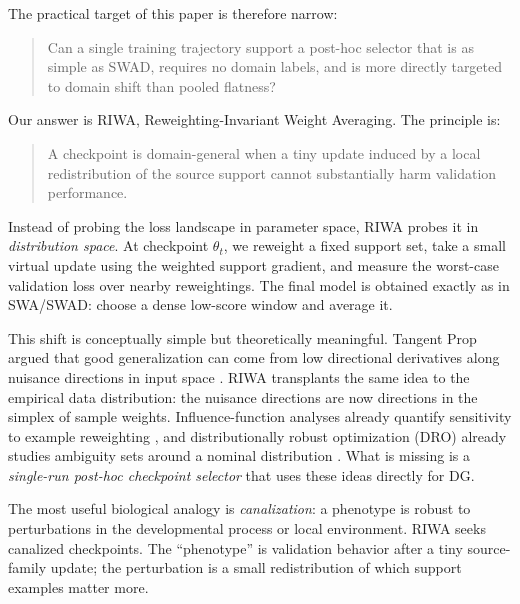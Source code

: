 \documentclass{article}
\newcommand{\riwa}{\textup{\textsc{RIWA}}}
\newcommand{\swad}{\textup{\textsc{SWAD}}}
\begin{document}
The practical target of this paper is therefore narrow:
\begin{quote}
Can a single training trajectory support a post-hoc selector that is as simple as \swad{}, requires no domain labels, and is more directly targeted to domain shift than pooled flatness?
\end{quote}

Our answer is \riwa{}, Reweighting-Invariant Weight Averaging. The principle is:
\begin{quote}
    A checkpoint is domain-general when a tiny update induced by a local redistribution of the source support cannot substantially harm validation performance.
\end{quote}
Instead of probing the loss landscape in parameter space, \riwa{} probes it in \emph{distribution space}. At checkpoint $\theta_t$, we reweight a fixed support set, take a small virtual update using the weighted support gradient, and measure the worst-case validation loss over nearby reweightings. The final model is obtained exactly as in SWA/\swad{}: choose a dense low-score window and average it.

This shift is conceptually simple but theoretically meaningful. Tangent Prop argued that good generalization can come from low directional derivatives along nuisance directions in input space \citep{simard1991tangent}. \riwa{} transplants the same idea to the empirical data distribution: the nuisance directions are now directions in the simplex of sample weights. Influence-function analyses already quantify sensitivity to example reweighting \citep{koh2017influence}, and distributionally robust optimization (DRO) already studies ambiguity sets around a nominal distribution \citep{duchi2020variance,duchi2021learning}. What is missing is a \emph{single-run post-hoc checkpoint selector} that uses these ideas directly for DG.

The most useful biological analogy is \emph{canalization}: a phenotype is robust to perturbations in the developmental process or local environment. \riwa{} seeks canalized checkpoints. The ``phenotype'' is validation behavior after a tiny source-family update; the perturbation is a small redistribution of which support examples matter more.
\end{document}
